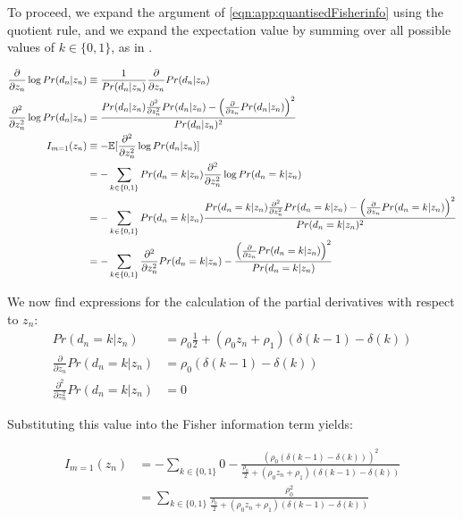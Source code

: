 To proceed, we expand the argument of \cref{eqn:app:quantisedFisherinfo} using the quotient rule, and we expand the expectation value by summing over all possible values of $k \in \{0,1 \}$, as in \cite{karlsson2005}. 

\begin{align}
\frac{\partial}{\partial z_n} \log Pr(d_n|z_n) & \equiv \frac{1}{Pr(d_n|z_n)}  \frac{\partial}{\partial z_n} Pr(d_n|z_n) \\ 
\frac{\partial^2}{\partial z_n^2} \log Pr(d_n|z_n) & = \frac{Pr(d_n|z_n)  \frac{\partial^2}{\partial z_n^2}Pr(d_n|z_n) - \left(  \frac{\partial}{\partial z_n} Pr(d_n|z_n) \right)^2 }{Pr(d_n|z_n)^2} \\
I_{m=1}(z_n) & \equiv - \mathbb{E}[\frac{\partial^2}{\partial z_n^2} \log Pr(d_n|z_n)] \\
& = - \sum_{k\in \{0, 1\}}  Pr(d_n=k|z_n)  \frac{\partial^2}{\partial z_n^2} \log Pr(d_n=k|z_n) \\
& = - \sum_{k\in \{0, 1\}}  Pr(d_n=k|z_n)  \frac{Pr(d_n=k|z_n)  \frac{\partial^2}{\partial z_n^2}Pr(d_n=k|z_n) - \left(  \frac{\partial}{\partial z_n} Pr(d_n=k|z_n) \right)^2 }{Pr(d_n=k|z_n)^2}\\
& = - \sum_{k\in \{0, 1\}}  \frac{\partial^2}{\partial z_n^2}Pr(d_n=k|z_n) - \frac{\left(  \frac{\partial}{\partial z_n} Pr(d_n=k|z_n) \right)^2 }{Pr(d_n=k|z_n)}
\end{align}

We now find expressions for the calculation of the partial derivatives with respect to $z_n$: 
\begin{align}
Pr(d_n=k|z_n) 
& = \rho_0 \frac{1}{2} + (\rho_0 z_n + \rho_1)\left( \delta(k-1) - \delta(k) \right) \\
\frac{\partial}{\partial z_n} Pr(d_n=k|z_n) & = \rho_0 \left( \delta(k-1) - \delta(k) \right)\\
\frac{\partial^2}{\partial z_n^2}Pr(d_n=k|z_n) & = 0
\end{align}

Substituting this value into the Fisher information term yields:

\begin{align}
I_{m=1}(z_n)  & = - \sum_{k\in \{0, 1\}}  0 - \frac{\left( \rho_0 \left( \delta(k-1) - \delta(k) \right) \right)^2 }{ \frac{\rho_0}{2} + (\rho_0 z_n + \rho_1)\left( \delta(k-1) - \delta(k) \right)} \\
& = \sum_{k\in \{0, 1\}} \frac{\rho_0^2}{ \frac{\rho_0}{2} + (\rho_0 z_n + \rho_1)\left( \delta(k-1) - \delta(k) \right)} \label{eqn:app:applied_fisherinfo:0}
\end{align}

